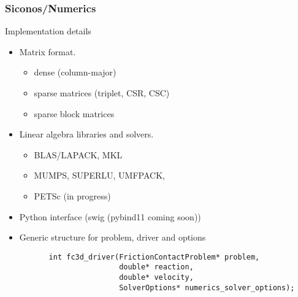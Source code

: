 \begin{frame}[fragile]
  \frametitle{Siconos/Numerics}
  \begin{block}
    {Implementation details}
     \begin{itemize}
     \item Matrix format.
       \begin{itemize}
       \item dense (column-major)
       \item sparse matrices (triplet, CSR, CSC)
       \item sparse block matrices
       \end{itemize}
     \item Linear algebra libraries and solvers.
       \begin{itemize}
       \item BLAS/LAPACK, MKL
       \item MUMPS, SUPERLU, UMFPACK,
       \item PETSc (in progress)
       \end{itemize}
     \item Python interface (swig (pybind11 coming soon))
     \item Generic structure for problem, driver and options
     \end{itemize}
   \end{block}
        {\small
        \begin{verbatim}
          int fc3d_driver(FrictionContactProblem* problem,
                          double* reaction,
                          double* velocity,
                          SolverOptions* numerics_solver_options);
       \end{verbatim}
     }
\end{frame}




